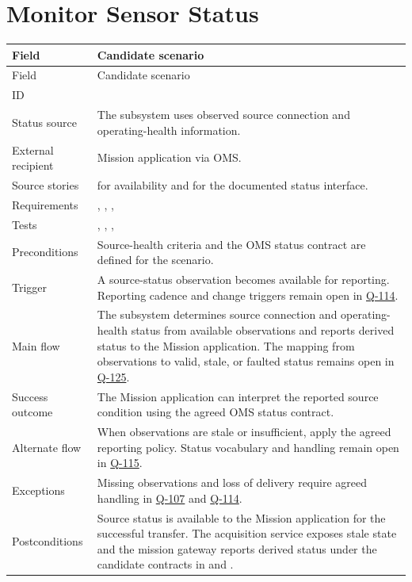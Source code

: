 \section{Monitor Sensor Status}

\small
\begin{tabularx}{\linewidth}{L{2.8cm}Y}
\caption{Monitor Sensor Status\label{Table:UC-02}}\\
\toprule
Field & Candidate scenario\\\midrule
\endfirsthead
\toprule
Field & Candidate scenario\\\midrule
\endhead
\bottomrule
\endlastfoot
ID & \\
Status source & The subsystem uses observed source connection and operating-health information.\\
External recipient & Mission application via OMS.\\
Source stories &  for availability and  for the documented status interface.\\
Requirements & , , , \\
Tests & , , , \\
Preconditions & Source-health criteria and the OMS status contract are defined for the scenario.\\
Trigger & A source-status observation becomes available for reporting. Reporting cadence and change triggers remain open in \hyperref[Question:Q-114]{Q-114}.\\
Main flow & The subsystem determines source connection and operating-health status from available observations and reports derived status to the Mission application. The mapping from observations to valid, stale, or faulted status remains open in \hyperref[Question:Q-125]{Q-125}.\\
Success outcome & The Mission application can interpret the reported source condition using the agreed OMS status contract.\\
Alternate flow & When observations are stale or insufficient, apply the agreed reporting policy. Status vocabulary and handling remain open in \hyperref[Question:Q-115]{Q-115}.\\
Exceptions & Missing observations and loss of delivery require agreed handling in \hyperref[Question:Q-107]{Q-107} and \hyperref[Question:Q-114]{Q-114}.\\
Postconditions & Source status is available to the Mission application for the successful transfer. The acquisition service exposes stale state and the mission gateway reports derived status under the candidate contracts in  and .\\
\end{tabularx}
\normalsize

